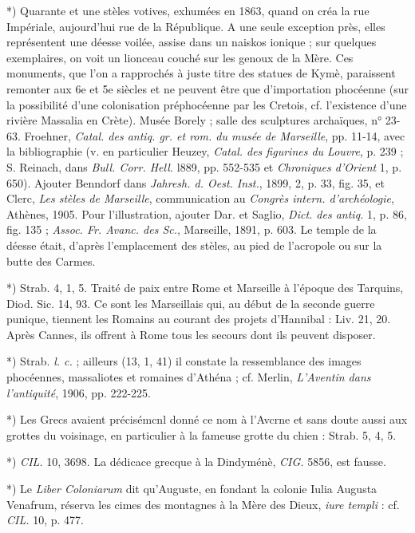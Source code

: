 \documentclass[a4paper, 11pt, oneside, polutonikogreek, french]{article}
\begin{document}
*) Quarante et une stèles votives, exhumées en 1863, quand on créa la rue Impériale, aujourd'hui rue de la République. A une seule exception près, elles représentent une déesse voilée, assise dans un naiskos ionique ; sur quelques exemplaires, on voit un lionceau couché sur les genoux de la Mère. Ces monuments, que l'on a rapprochés à juste titre des statues de Kymè, paraissent remonter aux 6e et 5e siècles et ne peuvent être que d'importation phocéenne (sur la possibilité d'une colonisation préphocéenne par les Cretois, cf. l'existence d'une rivière Massalia en Crète). Musée Borely ; salle des sculptures archaïques, n° 23-63. Froehner, \emph{Catal. des antiq. gr. et rom. du musée de Marseille}, pp. 11-14, avec la bibliographie (v. en particulier Heuzey, \emph{Catal. des figurines du Louvre}, p. 239 ; S. Reinach, dans \emph{Bull. Corr. Hell.} l889, pp. 552-535 et \emph{Chroniques d'Orient} 1, p. 650). Ajouter Benndorf dans \emph{Jahresh. d. Oest. Inst.}, 1899, 2, p. 33, fig. 35, et Clerc, \emph{Les stèles de Marseille}, communication au \emph{Congrès intern. d'archéologie}, Athènes, 1905. Pour l'illustration, ajouter Dar. et Saglio, \emph{Dict. des antiq.} 1, p. 86, fig. 135 ; \emph{Assoc. Fr. Avanc. des Sc.}, Marseille, 1891, p. 603. Le temple de la déesse était, d'après l'emplacement des stèles, au pied de l'acropole ou sur la butte des Carmes.

*) Strab. 4, 1, 5. Traité de paix entre Rome et Marseille à l'époque des Tarquins, Diod. Sic. 14, 93. Ce sont les Marseillais qui, au début de la seconde guerre punique, tiennent les Romains au courant des projets d'Hannibal : Liv. 21, 20. Après Cannes, ils offrent à Rome tous les secours dont ils peuvent disposer.

*) Strab. \emph{l. c.} ; ailleurs (13, 1, 41) il constate la ressemblance des images phocéennes, massaliotes et romaines d'Athéna ; cf. Merlin, \emph{L'Aventin dans l'antiquité}, 1906, pp. 222-225.

*) Les Grecs avaient précisémcnl donné ce nom à l'Avcrne et sans doute aussi aux grottes du voisinage, en particulier à la fameuse grotte du chien : Strab. 5, 4, 5.

*) \emph{CIL.} 10, 3698. La dédicace grecque à la Dindyménè, \emph{CIG.} 5856, est fausse.

*) Le \emph{Liber Coloniarum} dit qu'Auguste, en fondant la colonie Iulia Augusta Venafrum, réserva les cimes des montagnes à la Mère des Dieux, \emph{iure templi} : cf. \emph{CIL.} 10, p. 477.
\end{document}
